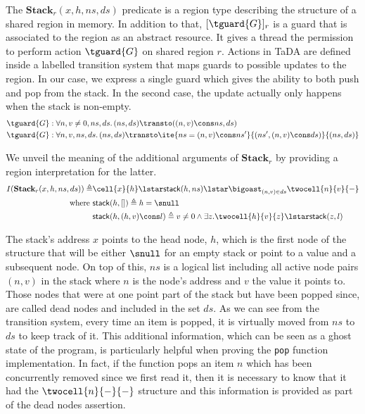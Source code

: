 The $\textbf{Stack}_r(x, h, ns, ds)$ predicate is a region type describing the structure of a shared region in memory. In addition to that, $[\tguard{G}]_r$ is a guard that is associated to the region as an abstract resource. It gives a thread the permission to perform action $\tguard{G}$ on shared region $r$. Actions in TaDA are defined inside a labelled transition system that maps guards to possible updates to the region. In our case, we express a single guard which gives the ability to both push and pop from the stack. In the second case, the update actually only happens when the stack is non-empty.
\begin{align*}
&\tguard{G}: \forall n, v \neq 0, ns, ds \ldotp (ns, ds) \transto ((n, v) \cons ns, ds)
\\
&\tguard{G}: \forall n, v, ns, ds \ldotp (ns, ds) \transto \ite{ns = (n, v) \cons ns'}{(ns', (n, v) \cons ds)}{(ns, ds)}
\end{align*}

We unveil the meaning of the additional arguments of $\textbf{Stack}_r$ by providing a region interpretation for the latter.
\begin{align*}
I(\textbf{Stack}_r(x, h, ns, ds)) \triangleq &\cell{x}{h} \lstar \mathsf{stack}(h, ns) \lstar \bigoast_{(n, v) \in ds} \twocell{n}{v}{-}
\\
\text{where } &\mathsf{stack}(h, []) \triangleq h = \snull
\\
&\mathsf{stack}(h, (h, v) \cons l) \triangleq v \neq 0 \land \exists z . \twocell{h}{v}{z} \lstar \mathsf{stack}(z, l)
\end{align*}

The stack's address $x$ points to the head node, $h$, which is the first node of the structure that will be either $\snull$ for an empty stack or point to a value and a subsequent node. On top of this, $ns$ is a logical list including all active node pairs $(n, v)$ in the stack where $n$ is the node's address and $v$ the value it points to. Those nodes that were at one point part of the stack but have been popped since, are called dead nodes and included in the set $ds$. As we can see from the transition system, every time an item is popped, it is virtually moved from $ns$ to $ds$ to keep track of it. This additional information, which can be seen as a ghost state of the program, is particularly helpful when proving the \texttt{pop} function implementation. In fact, if the function pops an item $n$ which has been concurrently removed since we first read it, then it is necessary to know that it had the $\twocell{n}{-}{-}$ structure and this information is provided as part of the dead nodes assertion.

